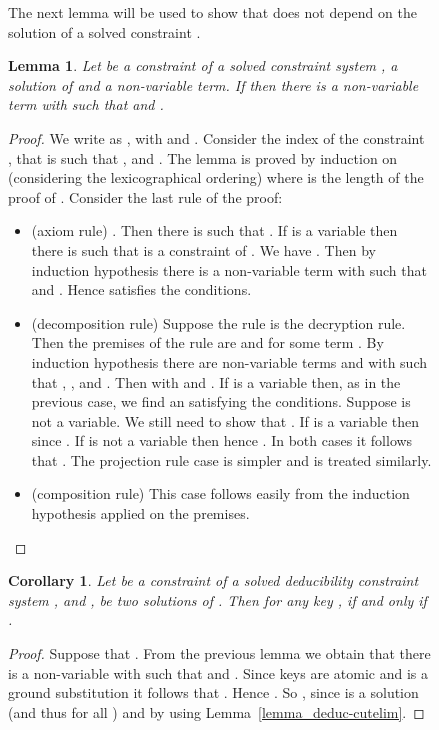 \documentclass[acmtocl,acmnow]{acmtrans2m}
\newtheorem{corollary}[theorem]{Corollary}
\newtheorem{lemma}[theorem]{Lemma}
\newcommand{\comment}[1]{}
\newcommand{\simple}{partial}
\newcommand{\dedsys}[1]{deducibility constraint system}
\begin{document}
\begin{figure}[t]
{{\comment{Let   be a solved constraint system,  be a {\simple} solution of  and  be a list of
messages
such that  and . Also let  be a set of
names of sort .  Let  be a partial ordering on . If there is  such that  is
deducible, that is  then the predicates  and
 hold. If all the keys in  are not deducible then  holds on
 if and only if
}


The next lemma will be used to show that  does not
depend on the 
solution  of a solved constraint .
\begin{lemma}\label{lem:similar_deduc}
Let  be a constraint of a solved constraint system ,
 a  solution of  and  a non-variable term. If  then there is a
non-variable term  with  such that  and .
\end{lemma}
\begin{proof}
We write  as , with  and .
Consider the index  of the constraint , that is such that ,  and . The lemma is proved by induction on  (considering the lexicographical ordering)
where  is the length of the proof of . Consider the last rule of the proof:
\begin{itemize}
 \item (axiom rule) . Then there is  such that . If  is a variable
then there is  such that  is a constraint of . We have . Then
by induction hypothesis there is a non-variable term  with  such that
 and . Hence  satisfies the conditions.

 \item (decomposition rule) Suppose the rule is the decryption rule. Then the premises of the rule are
 and  for some term . By induction hypothesis
there are non-variable terms  and  with  such that
, ,  and
. Then  with  and . If  is a variable then, as in
the previous case, we find an  satisfying the conditions. Suppose  is not a variable. We still need to
show that . If  is a variable then
 since . If  is not a variable then 
hence . In both cases it follows that . The projection rule case is
simpler and is treated similarly.

\item (composition rule) This case follows easily from the induction hypothesis applied on the premises.
\end{itemize}
\end{proof}



\begin{corollary}\label{cor:same_keys}
Let  be a constraint of a solved \dedsys{} , and ,  be two 
solutions of . Then for any key ,  if and only if .
\end{corollary}
\begin{proof}
Suppose that . From the previous lemma we obtain that there is a non-variable  with
 such that  and .
Since keys are atomic and  is a ground substitution it follows that . Hence
. So , since  is a  solution (and thus  for all ) and by using Lemma~\ref{lemma_deduc-cutelim}.
\end{proof}

}}
\end{figure}
\end{document}
